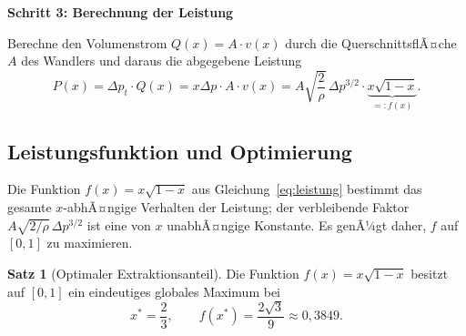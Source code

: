 ﻿\documentclass[a4paper,12pt]{article}
\theoremstyle{definition}
\newtheorem{satz}{Satz}
\begin{document}
\textbf{Schritt 3: Berechnung der Leistung}

Berechne den Volumenstrom $Q(x) = A \cdot v(x)$ durch die QuerschnittsflÃ¤che
$A$ des Wandlers und daraus die abgegebene Leistung
\begin{equation}
	\label{eq:leistung}
	P(x) = \Delta p_t \cdot Q(x) = x\Delta p \cdot A \cdot v(x)
	= A \sqrt{\frac{2}{\rho}}\, \Delta p^{3/2} \cdot \underbrace{x\sqrt{1-x}}_{=:f(x)}.
\end{equation}

\subsection{Leistungsfunktion und Optimierung}
\label{sec:optimierung}

Die Funktion $f(x) = x\sqrt{1-x}$ aus Gleichung~\eqref{eq:leistung}
bestimmt das gesamte $x$-abhÃ¤ngige Verhalten der Leistung; der
verbleibende Faktor $A\sqrt{2/\rho}\,\Delta p^{3/2}$ ist eine von $x$
unabhÃ¤ngige Konstante. Es genÃ¼gt daher, $f$ auf $[0,1]$ zu maximieren.

\begin{satz}[Optimaler Extraktionsanteil]
	\label{satz:optimal_x}
	Die Funktion $f(x) = x\sqrt{1-x}$ besitzt auf $[0,1]$ ein eindeutiges
	globales Maximum bei
	\[
		x^\ast = \frac{2}{3}, \qquad
		f(x^\ast) = \frac{2\sqrt{3}}{9} \approx 0{,}3849.
	\]
\end{satz}
\end{document}
